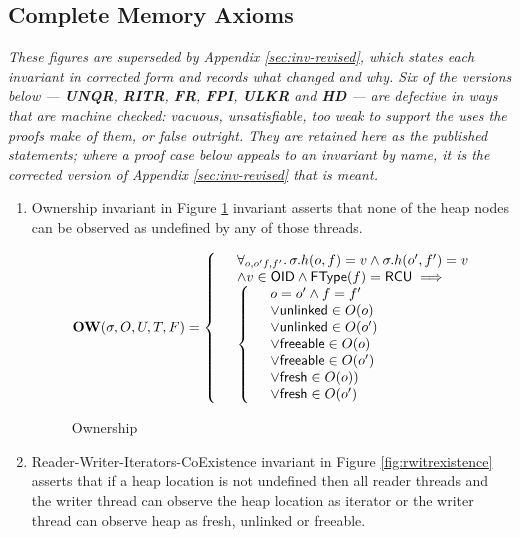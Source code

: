 \subsection{Complete Memory Axioms}
\label{sec:memaxioms}

\emph{These figures are superseded by Appendix \ref{sec:inv-revised}, which
states each invariant in corrected form and records what changed and why.  Six
of the versions below --- \textbf{UNQR}, \textbf{RITR}, \textbf{FR},
\textbf{FPI}, \textbf{ULKR} and \textbf{HD} --- are defective in ways that are
machine checked: vacuous, unsatisfiable, too weak to support the uses the proofs
make of them, or false outright.  They are retained here as the published statements; where a proof case
below appeals to an invariant by name, it is the corrected version of Appendix
\ref{sec:inv-revised} that is meant.}
\begin{enumerate}
\item{Ownership} invariant in Figure \ref{fig:ownership} invariant asserts that none of the heap nodes can be observed as undefined by any of those threads.
\begin{figure}[!htb]
\[
\textbf{OW}(\sigma,O,U,T,F) =
\left\{
\begin{array}{ll}
 	 & \forall_{o,o'f,f'} \ldotp  \sigma.h(o,f) = v \land \sigma.h(o',f') = v \\
	& \land v \in \textsf{OID}  \land  \textsf{FType}(f) = \textsf{RCU} \implies \\
 	&\left\{
		\begin{array}{cl}
			&  o=o' \land f=f' \\
			& \lor\textsf{unlinked} \in O(o) \\
		  & \lor \textsf{unlinked} \in O(o') \\
                  & \lor \textsf{freeable} \in O(o)\\
                  & \lor \textsf{freeable} \in O(o')\\
		        & \lor \textsf{fresh} \in O(o)) \\
                        & \lor \textsf{fresh} \in O(o')
		\end{array}
		\right.%
\end{array}
\right.%
\]
\caption{Ownership}
\label{fig:ownership}
\end{figure}
\item{Reader-Writer-Iterators-CoExistence} invariant in Figure \ref{fig:rwitrexistence} asserts that  if a heap location is not undefined then all reader threads and the writer thread can observe the heap location as \textsf{iterator} or the writer thread can observe heap as \textsf{fresh}, \textsf{unlinked} or \textsf{freeable}.

\end{enumerate}
